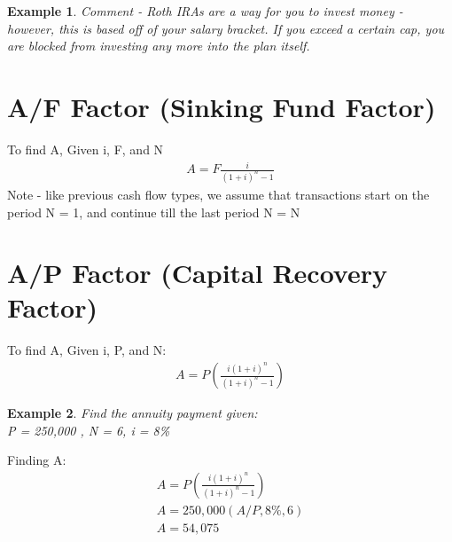 \documentclass{report} %
\newtheorem{exmp}{Example}
\begin{document}
\begin{exmp}
    Comment - Roth IRAs are a way for you to invest money - however, this is based off of your salary bracket. If you exceed a certain cap, you are blocked from investing any more into the plan itself.
\end{exmp}

\section*{A/F Factor (Sinking Fund Factor)}
To find A, Given i, F, and N
\begin{equation*}
    \begin{aligned}
        A = F\frac{i}{(1+i)^n-1}
    \end{aligned}
\end{equation*}
Note - like previous cash flow types, we assume that transactions start on the period N = 1, and continue till the last period N = N

\section*{A/P Factor (Capital Recovery Factor)}
To find A, Given i, P, and N:
\begin{equation*}
    \begin{aligned}
        A = P(\frac{i(1+i)^n}{(1+i)^n-1})
    \end{aligned}
\end{equation*}

\begin{exmp}
    Find the annuity payment given: \\
    P = 250,000 \quad, N = 6, i = 8\%
\end{exmp}
Finding A:
\begin{equation*}
    \begin{aligned}
        A = P(\frac{i(1+i)^n}{(1+i)^n-1}) \\
        A = 250,000(A/P, 8\%, 6) \\
        A = 54,075 \\
    \end{aligned}
\end{equation*}
\end{document}

